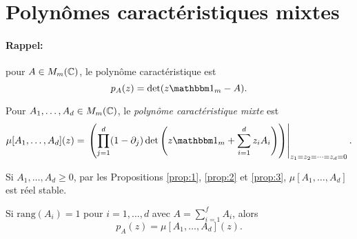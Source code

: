 \section{Polynômes caractéristiques mixtes}
\label{sec:polyn-caract-mixtes}

\paragraph{Rappel:} pour $A \in M_m(\mathbb{C})$, le polynôme caractéristique est 
\[ p_A(z) = \det(z \un_m - A). \]

\begin{defi}
  Pour $A_1, \ldots, A_d \in M_m(\mathbb{C})$, le \emph{polynôme caractéristique
    mixte} est 
  \[ \mu[A_1, \ldots, A_d](z) = \left . \left(\prod_{j=1}^{d}(1 - \partial_j) \det\left(z \un_m + \sum_{i=1}^{d} z_i
        A_i\right)\right) \right|_{z_1=z_2=\cdots=z_d=0}. \]
\end{defi}

\begin{rem}
  Si $A_1, \ldots, A_d \geq 0$, par les Propositions \ref{prop:1}, \ref{prop:2} et \ref{prop:3}, $\mu[A_1,
  \ldots, A_d]$ est réel stable.
\end{rem}

\begin{prop}
  \label{prop:6}
  Si $\mathrm{rang}(A_i) = 1$ pour $i = 1, \ldots, d$ avec $A = \sum_{i = 1}^{f}A_i$, alors 
  \[ p_A(z) = \mu[A_1, \ldots, A_d](z). \]
\end{prop}

